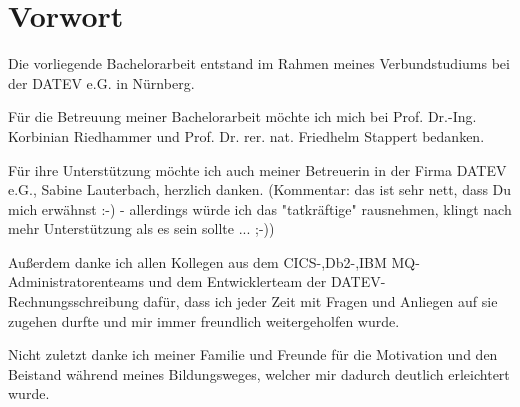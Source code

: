 \newpage
\section*{Vorwort}
Die vorliegende Bachelorarbeit entstand im Rahmen meines Verbundstudiums bei der DATEV e.G. in Nürnberg.

Für die Betreuung meiner Bachelorarbeit möchte ich mich bei Prof. Dr.-Ing. Korbinian Riedhammer und Prof. Dr. rer. nat. Friedhelm Stappert bedanken.

Für ihre Unterstützung möchte ich auch meiner Betreuerin in der Firma DATEV e.G., Sabine Lauterbach,  herzlich danken. (Kommentar: das ist sehr nett, dass Du mich erwähnst :-) - allerdings würde ich das "tatkräftige" rausnehmen, klingt nach mehr Unterstützung als es sein sollte ... ;-))

Außerdem danke ich allen Kollegen aus dem CICS-,Db2-,IBM MQ-Administratorenteams und dem Entwicklerteam der DATEV-Rechnungsschreibung dafür, dass ich jeder Zeit mit Fragen und Anliegen auf sie zugehen durfte und mir immer freundlich weitergeholfen wurde.

Nicht zuletzt danke ich meiner Familie und Freunde für die Motivation und den Beistand während meines Bildungsweges, welcher mir dadurch deutlich erleichtert wurde.

